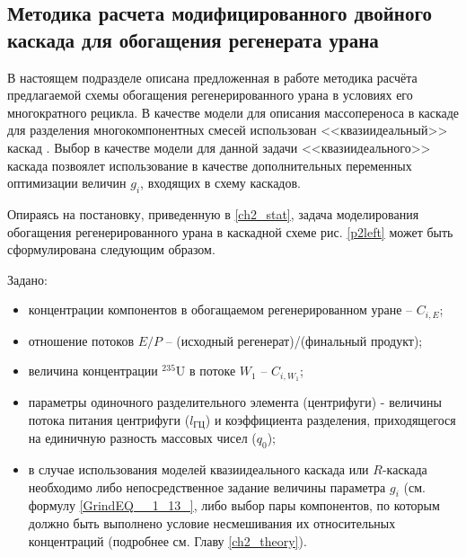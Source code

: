 
\subsection{Методика расчета модифицированного двойного каскада для обогащения регенерата урана}\label{statement}

В настоящем подразделе описана предложенная в работе методика расчёта предлагаемой схемы обогащения регенерированного урана в условиях его многократного рецикла. В качестве модели для описания массопереноса в каскаде для разделения многокомпонентных смесей использован <<квазиидеальный>> каскад \cite{sazykinKvaziidealnyeKaskadyDlya2000}. Выбор в качестве модели для данной задачи <<квазиидеального>> каскада позвоялет использование в качестве дополнительных переменных оптимизации величин $g_{i}$, входящих в схему каскадов. 


Опираясь на постановку, приведенную в \ref{ch2_stat}, задача моделирования обогащения регенерированного урана в каскадной схеме рис. \ref{p2left} может быть сформулирована следующим образом.

Задано:

\begin{itemize}
    \item концентрации компонентов в обогащаемом регенерированном уране -- $C_{i,{E}}$; 
    \item отношение потоков $E/P$ -- (исходный регенерат)/(финальный продукт);
    \item величина концентрации $^{235}$U в потоке $W_{1}$ -- $C_{i,{W_1}}$;
    \item параметры одиночного разделительного элемента (центрифуги) - величины потока питания центрифуги ($l_{ГЦ}$) и коэффициента разделения, приходящегося на единичную разность массовых чисел ($q_{0}$);
    \item в случае использования моделей квазиидеального каскада или $R$-каскада необходимо либо непосредственное задание величины параметра $g_i$ (см. формулу \ref{GrindEQ__1_13_}, либо выбор пары компонентов, по которым должно быть выполнено условие несмешивания их относительных концентраций (подробнее см. Главу \ref{ch2_theory}).
\end{itemize}

